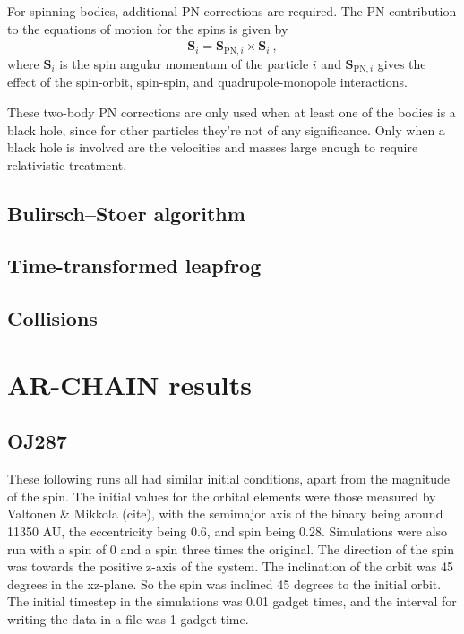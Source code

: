 \documentclass[english, oneside]{HYgradu}
\begin{document}
For spinning bodies, additional PN corrections are required. The PN contribution to the equations of motion for the spins is given by
\begin{equation}
\boldsymbol{\dot{S}}_i = \boldsymbol{S}_{\mathrm{PN},i} \times \boldsymbol{S}_i \ ,
\end{equation}
where $\boldsymbol{S}_i$ is the spin angular momentum of the particle $i$ and $\boldsymbol{S}_{\mathrm{PN},i}$ gives the effect of the spin-orbit, spin-spin, and quadrupole-monopole interactions. %

These two-body PN corrections are only used when at least one of the bodies is a black hole, since for other particles they're not of any significance. Only when a black hole is involved are the velocities and masses large enough to require relativistic treatment.

\section{Bulirsch–Stoer algorithm}
\section{Time-transformed leapfrog}
\section{Collisions}

\chapter{AR-CHAIN results}
\section{OJ287}

These following runs all had similar initial conditions, apart from the magnitude of the spin. The initial values for the orbital elements were those measured by Valtonen \& Mikkola (cite), with the semimajor axis of the binary being around 11350 AU, the eccentricity being 0.6, and spin being 0.28. Simulations were also run with a spin of 0 and a spin three times the original. The direction of the spin was towards the positive z-axis of the system. The inclination of the orbit was 45 degrees in the xz-plane. So the spin was inclined 45 degrees to the initial orbit. The initial timestep in the simulations was 0.01 gadget times, and the interval for writing the data in a file was 1 gadget time. 
\end{document}

